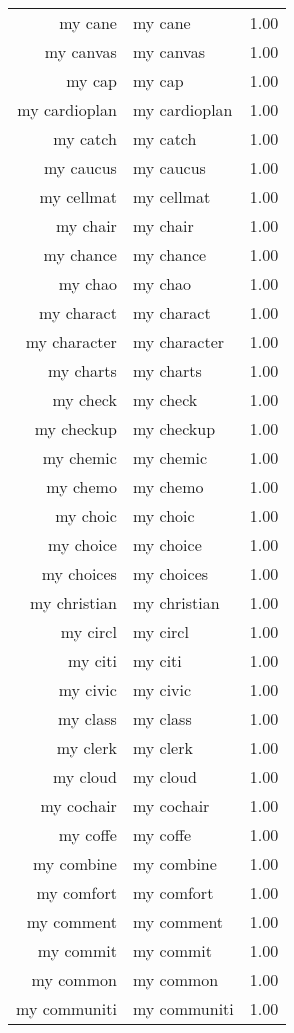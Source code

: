 \begin{table}[ht]
\begin{tabular}{rlr}
  my cane & my cane & 1.00 \\ 
  my canvas & my canvas & 1.00 \\ 
  my cap & my cap & 1.00 \\ 
  my cardioplan & my cardioplan & 1.00 \\ 
  my catch & my catch & 1.00 \\ 
  my caucus & my caucus & 1.00 \\ 
  my cellmat & my cellmat & 1.00 \\ 
  my chair & my chair & 1.00 \\ 
  my chance & my chance & 1.00 \\ 
  my chao & my chao & 1.00 \\ 
  my charact & my charact & 1.00 \\ 
  my character & my character & 1.00 \\ 
  my charts & my charts & 1.00 \\ 
  my check & my check & 1.00 \\ 
  my checkup & my checkup & 1.00 \\ 
  my chemic & my chemic & 1.00 \\ 
  my chemo & my chemo & 1.00 \\ 
  my choic & my choic & 1.00 \\ 
  my choice & my choice & 1.00 \\ 
  my choices & my choices & 1.00 \\ 
  my christian & my christian & 1.00 \\ 
  my circl & my circl & 1.00 \\ 
  my citi & my citi & 1.00 \\ 
  my civic & my civic & 1.00 \\ 
  my class & my class & 1.00 \\ 
  my clerk & my clerk & 1.00 \\ 
  my cloud & my cloud & 1.00 \\ 
  my cochair & my cochair & 1.00 \\ 
  my coffe & my coffe & 1.00 \\ 
  my combine & my combine & 1.00 \\ 
  my comfort & my comfort & 1.00 \\ 
  my comment & my comment & 1.00 \\ 
  my commit & my commit & 1.00 \\ 
  my common & my common & 1.00 \\ 
  my communiti & my communiti & 1.00 \\ 

\end{tabular}
\end{table}
